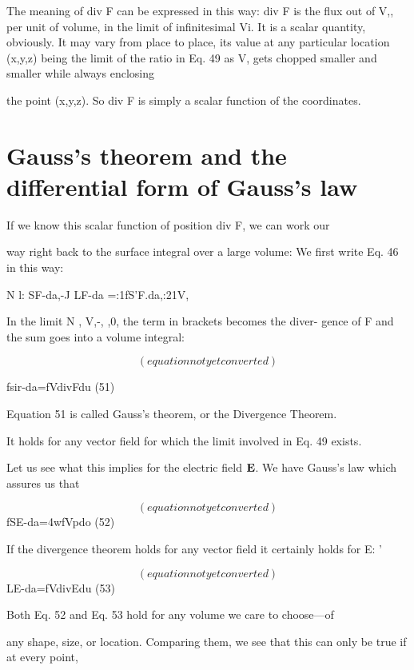 The meaning of div F can be expressed in this way: div F is the
flux out of V,, per unit of volume, in the limit of infinitesimal Vi. It
is a scalar quantity, obviously. It may vary from place to place, its
value at any particular location (x,y,z) being the limit of the ratio in
Eq. 49 as V, gets chopped smaller and smaller while always enclosing

the point (x,y,z). So div F is simply a scalar function of the
coordinates.

\section{Gauss's theorem and the differential form of Gauss's law}

If we know this scalar function of position div F, we can work our

way right back to the surface integral over a large volume: We first
write Eq. 46 in this way:

N l: SF-da,-J
LF-da =:1fS'F.da,:21V,~  

In the limit N , V,-, \rightarrow,0, the term in brackets becomes the diver-
gence of F and the sum goes into a volume integral:

\begin{equation}
(equation not yet converted)
\end{equation}

fsir-da=fVdivFdu (51)

Equation 51 is called Gauss's theorem, or the Divergence Theorem.

It holds for any vector field for which the limit involved in Eq. 49
exists.

Let us see what this implies for the electric field $\mathbf{E}$. We have
Gauss's law which assures us that

\begin{equation}
(equation not yet converted)
\end{equation}
fSE-da=4wfVpdo (52)

If the divergence theorem holds for any vector field it certainly holds
for E: '

\begin{equation}
(equation not yet converted)
\end{equation}
LE-da=fVdivEdu (53)

Both Eq. 52 and Eq. 53 hold for any volume we care to choose---of

any shape, size, or location. Comparing them, we see that this can
only be true if at every point,

